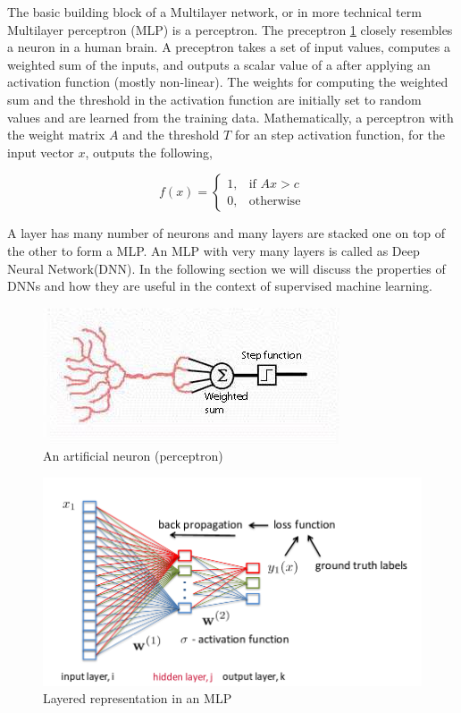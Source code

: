 \documentclass[a4paper]{article}
\begin{document}
The  basic  building block of a  Multilayer network, or  in more technical  term
Multilayer  perceptron  (MLP)  is a  perceptron.  The  preceptron  \ref{fig:ann}
closely resembles a neuron in a human brain. A preceptron takes
a set of input  values,  computes a weighted sum of  the  inputs, and outputs  a
scalar value of a after applying an activation function (mostly non-linear). The
weights for  computing  the  weighted  sum and  the threshold  in the activation
function  are initially  set to random values and are learned  from the training
data. Mathematically, a perceptron with the  weight matrix $A$ and the threshold
$T$  for  an  step activation function, for the  input vector $x$,  outputs  the
following,


\[
  f(x)=
  \begin{cases}
    1, & \text{if }  A x > c \\
    0, & \text{otherwise}
  \end{cases}
\]


A layer has many number of neurons and many layers are stacked one on top of the
other to form a MLP. An  MLP  with very  many layers is  called  as Deep  Neural
Network(DNN). In the following section we will discuss  the properties  of  DNNs
and how they are useful in the context of supervised machine learning.


\begin{figure}
  \includegraphics[width=.99\linewidth]{img/artificial.jpg}
  \caption{ An artificial neuron (perceptron)}
  \label{fig:ann}
\end{figure}


\begin{figure}
  \includegraphics[width=.99\linewidth]{img/mlp.png}
  \caption{Layered representation in an MLP}
  \label{fig:mlp}
\end{figure}
\end{document}
